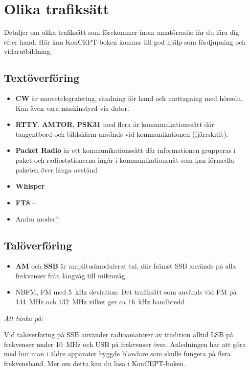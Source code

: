 \section{Olika trafiksätt}

Detaljer om olika trafiksätt som förekommer inom amatörradio får du lära dig efter hand. Här kan KonCEPT-boken komma till god hjälp som fördjupning och vidarutbildning.

\subsection{Textöverföring}

\begin{itemize}
	\item \textbf{CW} är morsetelegrafering, sändning för hand och mottagning med hörseln. Kan även vara maskinstyrd via dator.
	\item \textbf{RTTY}, \textbf{AMTOR}, \textbf{PSK31} med flera är kommunikationssätt där tangentbord och bildskärm används vid kommunikationen (fjärrskrift).
	\item \textbf{Packet Radio} är ett kommunikationssätt där informationen grupperas i paket och radiostationerna ingår i kommunikationsnät som kan förmedla paketen över långa avstånd
	\item \textbf{Whisper} -- 
	\item \textbf{FT8} --
	\item Andra moder?
\end{itemize}


\subsection{Talöverföring}

\begin{itemize}
	\item \textbf{AM} och \textbf{SSB} är amplitudmodulerat tal, där främst SSB används på alla frekvenser från långvåg till mikrovåg.
	\item NBFM, FM med \SI{5}{kHz} deviation: Det trafiksätt som används vid FM på \SI{144}{MHz} och \SI{432}{MHz} vilket ger ca \SI{16}{kHz} bandbredd.
\end{itemize}

\emph{Att tänka på:}

Vid talöverföring på SSB använder radioamatörer av tradition alltid LSB på frekvenser under \SI{10}{MHz} och USB på frekvenser över. Anledningen har att göra med hur man i äldre apparater byggde blandare som skulle fungera på flera frekvensband. Mer om detta kan du läsa i KonCEPT-boken.

